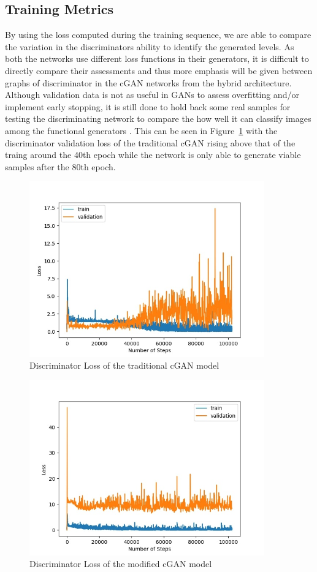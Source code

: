 \documentclass{Configuration_Files/PoliMi3i_thesis}
\begin{document}
\subsection{Training Metrics}
By using the loss computed during the training sequence, we are able to compare the 
variation in the discriminators ability to identify the generated levels. As both the 
networks use different loss functions in their generators, it is difficult to directly
compare their assessments and thus more emphasis will be given between graphs of 
discriminator in the cGAN networks from the hybrid architecture. Although 
validation data is not as useful in GANs to assess overfitting and/or implement early 
stopping, it is still done to hold back some real samples for testing the discriminating 
network to compare the how well it can classify images among the functional 
generators \cite{DeT20}. This can be seen in Figure~\ref{fig:tradloss} with the discriminator validation loss of 
the traditional cGAN rising above that of the traing around the 40th epoch while the network is only able 
to generate viable samples after the 80th epoch.
\begin{figure}[H]
    \centering
    \includegraphics[width=0.9\textwidth]{trad_cgan_loss.jpg}
    \caption{Discriminator Loss of the traditional cGAN model}
    \label{fig:tradloss}
\end{figure}
\begin{figure}[H]
    \centering
    \includegraphics[width=0.9\textwidth]{mod_cgan_loss.jpg}
    \caption{Discriminator Loss of the modified cGAN model}
    \label{fig:modloss}
\end{figure}
\end{document}
